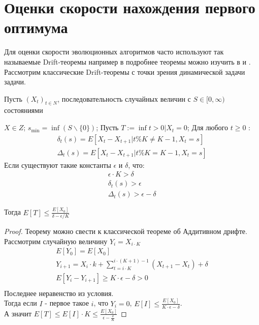 \documentclass[times]{itmo-student-thesis}
\begin{document}
    \section{Оценки скорости нахождения первого оптимума}
    Для оценки скорости эволюционных алгоритмов часто используют так называемые Drift-теоремы например в \cite{use_drift} подробнее теоремы можно изучить в \cite{drifts_1} и \cite{drifts_2}.
    Рассмотрим классические Drift-теоремы с точки зрения динамической задачи задачи.
    \begin{theorem}
        \label{drift:add}
        Пусть $(X_t)_{t \in N}$, последовательность случайных величин с $S \in [0, \infty)$ состояниями

        $X \in Z$;
        $s_{\min} = \inf(S \backslash \{0\})$;
        Пусть $T := \inf{t > 0 | X_t = 0}$;
        Для любого $t \geq 0$ :
        \begin{gather*}
            \delta_t(s) = E[X_t - X_{t + 1}| t \% K \neq K - 1, X_t = s]  \\
            \Delta_t(s) = E[X_t - X_{t + 1}| t \% K = K - 1, X_t = s]
        \end{gather*}
        Если существуют такие константы $\epsilon$ и $\delta$, что:
        \begin{gather*}
            \epsilon \cdot K > \delta \\
            \delta_t(s) > \epsilon \\
            \Delta_t(s) > \epsilon - \delta
        \end{gather*}

        Тогда $E[T] \leq \frac{E[X_0]}{\delta - \epsilon/K}$
    \end{theorem}
    \begin{proof}
        Теорему можно свести к классической теореме об Аддитивном дрифте. \cite{drifts_2}
        Рассмотрим случайную величину $Y_i = X_{i \cdot K}$
        \begin{gather*}
            E[Y_0] = E[X_0] \\
            Y_{i + 1} = X_i \cdot k + \sum_{t=i \cdot K}^{i \cdot (K + 1) - 1} (X_{t + 1} - X_{t}) + \delta \\
            E[Y_i - Y_{i + 1}] \geq  K \cdot \epsilon - \delta > 0 \\
        \end{gather*}
        Последнее неравенство из условия. \\
        Тогда если $I$ - первое такое $i$, что $Y_i = 0$, $E[I] \leq \frac{E[X_0]}{K \cdot \epsilon - \delta}$. \\
        А значит $E[T] \leq E[I] \cdot K \leq \frac{E[X_0]}{\epsilon - \frac{\delta}{K}}$
    \end{proof}
\end{document}
